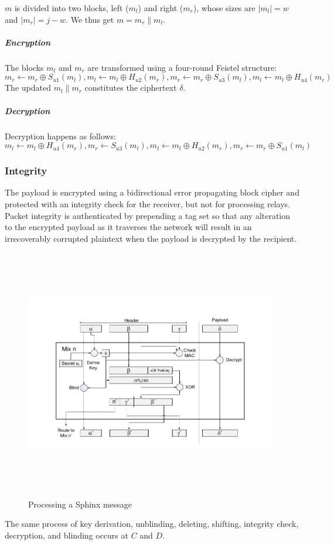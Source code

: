 $m$ is divided into two blocks, left ($m_l$) and right ($m_r$), whose sizes are $|m_l|=w$ and $|m_r|=j-w$. We thus get $m=m_r\|m_l$.
\subparagraph{Encryption}
The blocks $m_l$ and $m_r$ are transformed using a four-round Feistel structure:
$$m_r\leftarrow m_r \oplus S_{u1}(m_l), m_l\leftarrow m_l \oplus H_{u2}(m_r), m_r\leftarrow m_r\oplus S_{u3}(m_l), m_l\leftarrow m_l\oplus H_{u4}(m_r)$$
The updated $m_l\|m_r$ constitutes the ciphertext $\delta$.
\subparagraph{Decryption} Decryption happens as follows:
$$m_l\leftarrow m_l\oplus H_{u4}(m_r), m_r\leftarrow S_{u3}(m_l), m_l\leftarrow m_l\oplus H_{u2}(m_r), m_r\leftarrow m_r\oplus S_{u1}(m_l)$$

\subsubsection{Integrity}
The payload is encrypted using a bidirectional error propagating block cipher
and protected with an integrity check for the receiver, but not
for processing relays. Packet integrity is authenticated by prepending a tag set so that any alteration to the encrypted payload as it traverses the network will result in an irrecoverably corrupted plaintext when the payload is decrypted by the recipient.

\begin{figure}[H]
    \centering
    \includegraphics[width=11cm,height=11cm,keepaspectratio]{../yellowpaper/images/sphinx1.png}
    \caption{Processing a Sphinx message \cite{sphinxpaper}}
    \label{fig:The processing of a Sphinx message }
\end{figure}
The same process of key derivation, unblinding, deleting, shifting, integrity check, decryption, and blinding occurs at $C$ and $D$.

